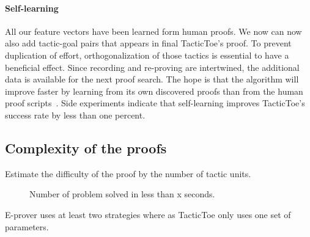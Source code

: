 \documentclass[runningheads,a4paper,draft]{svjour3}
\def\eprover{\textsf{E-prover}\xspace}
\def\tactictoe{\textsf{TacticToe}\xspace}
\begin{document}
\paragraph{Self-learning}
All our feature vectors have been learned form human proofs. We now can now
also add tactic-goal pairs that appears in final \tactictoe's proof. To prevent
duplication of effort, orthogonalization of those
tactics is essential to have a beneficial effect.
Since recording and re-proving are intertwined, the additional data is
available for the next proof search.
The hope is that the algorithm will improve faster by learning from its own
discovered proofs than from the human proof
scripts~\cite{DBLP:conf/cade/Urban07}. Side experiments indicate that
self-learning improves \tactictoe's success rate by less than one percent.



\subsection{Complexity of the proofs}


Estimate the difficulty of the proof by the number of tactic units.




\begin{figure}[h]
\centering
{}
\caption{Number of problem solved in less than x seconds.}
\end{figure}
\eprover uses at least two strategies where as \tactictoe only uses one set
of parameters.
\end{document}
